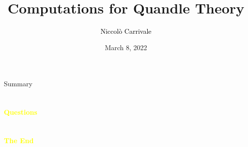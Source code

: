 \documentclass[aspectratio=43]{beamer}
\title{Computations for Quandle Theory} %
\subtitle{}
\author[N. Carrivale]{\textcolor{black}{Niccolò Carrivale}}
\institute[Radboud University]{
    \textcolor{black}{Faculty of Science}%
    \\%
    \textcolor{black}{Radboud University}%
}
\date{March 8, 2022}
\begin{document}
    
    \frame{\titlepage}
    
    \begin{frame}{Summary}
        \tableofcontents
    \end{frame}
    
    
    


  \section{}
    \begin{frame}{}
        \centering
            \Huge\bfseries
        \textcolor{yellow}{Questions}
        
    \end{frame}
    
    \section{}
    \begin{frame}{}
        \centering
            \Huge\bfseries
        \textcolor{yellow}{The End}
        
    \end{frame}
\end{document}
